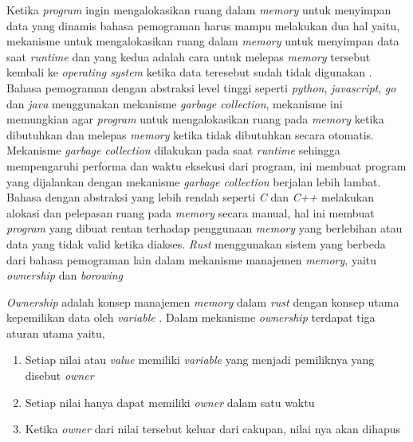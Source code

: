 Ketika \emph{program} ingin mengalokasikan ruang dalam \emph{memory} untuk menyimpan data yang dinamis bahasa pemograman harus mampu melakukan dua hal yaitu, mekanisme untuk mengalokasikan ruang dalam \emph{memory} untuk menyimpan data saat \emph{runtime} dan yang kedua adalah cara untuk melepas \emph{memory} tersebut kembali ke \emph{operating system} ketika data teresebut sudah tidak digunakan \citep{rustbook}. Bahasa pemograman dengan abstraksi level tinggi seperti \emph{python}, \emph{javascript}, \emph{go} dan \emph{java} menggunakan mekanisme \emph{garbage collection}, mekanisme ini memungkian agar \emph{program} untuk mengalokasikan ruang pada \emph{memory} ketika dibutuhkan dan melepas \emph{memory} ketika tidak dibutuhkan secara otomatis. Mekanisme \emph{garbage collection} dilakukan pada saat \emph{runtime} sehingga mempengaruhi performa dan waktu eksekusi dari program, ini membuat program yang dijalankan dengan mekanisme \emph{garbage collection} berjalan lebih lambat. Bahasa dengan abstraksi yang lebih rendah seperti \emph{C} dan \emph{C++} melakukan alokasi dan pelepasan ruang pada \emph{memory} secara manual, hal ini membuat \emph{program} yang dibuat rentan terhadap penggunaan \emph{memory} yang berlebihan atau data yang tidak valid ketika diakses. \emph{Rust} menggunakan sistem yang berbeda dari bahasa pemograman lain dalam mekanisme manajemen \emph{memory}, yaitu \emph{ownership} dan \emph{borowing} \citep{rustbook}

\emph{Ownership} adalah konsep manajemen \emph{memory} dalam \emph{rust} dengan konsep utama kepemilikan data oleh \emph{variable} \citep{rustbook}. Dalam mekanisme \emph{ownership} terdapat tiga aturan utama yaitu,

\begin{enumerate}
  \item{Setiap nilai atau \emph{value} memiliki \emph{variable} yang menjadi pemiliknya yang disebut \emph{owner}}
  \item{Setiap nilai hanya dapat memiliki \emph{owner} dalam satu waktu}
  \item{Ketika \emph{owner} dari nilai tersebut keluar dari cakupan, nilai nya akan dihapus}
\end{enumerate}

